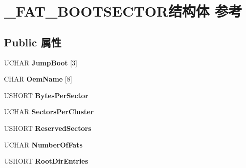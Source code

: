 \hypertarget{struct___f_a_t___b_o_o_t_s_e_c_t_o_r}{}\section{\+\_\+\+F\+A\+T\+\_\+\+B\+O\+O\+T\+S\+E\+C\+T\+O\+R结构体 参考}
\label{struct___f_a_t___b_o_o_t_s_e_c_t_o_r}
\subsection*{Public 属性}
\begin{DoxyCompactItemize}
\item 
\mbox{\label{struct___f_a_t___b_o_o_t_s_e_c_t_o_r_a0d3338fc8feb647df407a5cf958525e4}} 
U\+C\+H\+AR {\bfseries Jump\+Boot} \mbox{[}3\mbox{]}
\item 
\mbox{\label{struct___f_a_t___b_o_o_t_s_e_c_t_o_r_a70931413bfb72732ff73474cff5641bd}} 
C\+H\+AR {\bfseries Oem\+Name} \mbox{[}8\mbox{]}
\item 
\mbox{\label{struct___f_a_t___b_o_o_t_s_e_c_t_o_r_aa1622bd0d632d05319d302d28e58180c}} 
U\+S\+H\+O\+RT {\bfseries Bytes\+Per\+Sector}
\item 
\mbox{\label{struct___f_a_t___b_o_o_t_s_e_c_t_o_r_afa5d8874f03f10b16b273d74842e969f}} 
U\+C\+H\+AR {\bfseries Sectors\+Per\+Cluster}
\item 
\mbox{\label{struct___f_a_t___b_o_o_t_s_e_c_t_o_r_a82e34c11ecb8b83321b433481e50bb67}} 
U\+S\+H\+O\+RT {\bfseries Reserved\+Sectors}
\item 
\mbox{\label{struct___f_a_t___b_o_o_t_s_e_c_t_o_r_a50127140e1ea0fb9f85010d29108c906}} 
U\+C\+H\+AR {\bfseries Number\+Of\+Fats}
\item 
\mbox{\label{struct___f_a_t___b_o_o_t_s_e_c_t_o_r_aa526dd8901e2fd42480f9ab2868a80a9}} 
U\+S\+H\+O\+RT {\bfseries Root\+Dir\+Entries}
\item 
\mbox{\label{struct___f_a_t___b_o_o_t_s_e_c_t_o_r_a41498ea9b586920f26787c2101807deb}} 

\end{DoxyCompactItemize}
